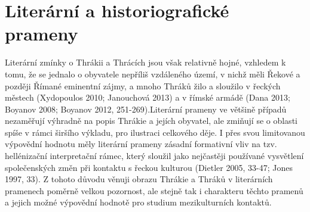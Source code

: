 
\section[literární-a-historiografické-prameny]{Literární a historiografické prameny}

Literární zmínky o Thrákii a Thrácích jsou však relativně hojné, vzhledem k tomu, že se jednalo o obyvatele nepříliš vzdáleného území, v nichž měli Řekové a později Římané eminentní zájmy, a mnoho Thráků žilo a sloužilo v řeckých městech (Xydopoulos 2010; Janouchová 2013) a v římské armádě (Dana 2013; Boyanov 2008; Boyanov 2012, 251-269).Literární prameny ve většině případů nezaměřují výhradně na popis Thrákie a jejích obyvatel, ale zmiňují se o oblasti spíše v rámci širšího výkladu, pro ilustraci celkového děje. I přes svou limitovanou výpovědní hodnotu měly literární prameny zásadní formativní vliv na tzv. hellénizační interpretační rámec, který sloužil jako nejčastěji používané vysvětlení společenských změn při kontaktu s řeckou kulturou (Dietler 2005, 33-47; Jones 1997, 33). Z tohoto důvodu věnuji obrazu Thrákie a Thráků v literárních pramenech poměrně velkou pozornost, ale stejně tak i charakteru těchto pramenů a jejich možné výpovědní hodnotě pro studium mezikulturních kontaktů.

